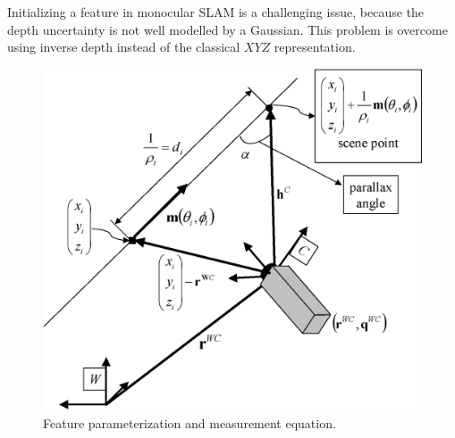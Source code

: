 \documentclass[a4paper,12pt]{article}
\begin{document}
Initializing a feature in monocular SLAM is a challenging issue,
because the depth uncertainty is not well modelled by a Gaussian.
This problem is overcome using inverse depth instead of the
classical $XYZ$ representation.
\begin{figure}
\centering
\includegraphics[width=0.5\columnwidth]{FeatureObservationAndParameterization.eps}
\caption{Feature parameterization and measurement equation.}
\label{fig_feat_par}
\end{figure}
\end{document}
